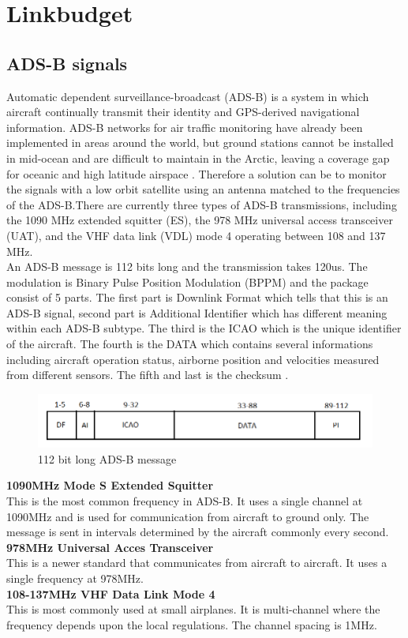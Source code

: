 \chapter{Linkbudget}\label{ch:linkbudget}

\section{ADS-B signals}
Automatic dependent surveillance-broadcast (ADS-B) is a system in which aircraft continually transmit their identity and GPS-derived navigational information. ADS-B networks for air traffic monitoring have already been implemented in areas around the world, but ground stations cannot be installed in mid-ocean and are difficult to maintain in the Arctic, leaving a coverage gap for oceanic and high latitude airspace \citep{FlyingLab}. Therefore a solution can be to monitor the signals with a low orbit satellite using an antenna matched to the frequencies of the ADS-B.There are currently three types of ADS-B transmissions, including the 1090 MHz extended squitter (ES), the 978 MHz universal access transceiver (UAT), and the VHF data link (VDL) mode 4 operating between 108 and 137 MHz.
 \\
An ADS-B message is 112 bits long and the transmission takes 120us. The modulation is Binary Pulse Position Modulation (BPPM) and the package consist of 5 parts. The first part is Downlink Format which tells that this is an ADS-B signal, second part is Additional Identifier which has different meaning within each ADS-B subtype. The third is the ICAO which is the unique identifier of the aircraft. The fourth is the DATA which contains several informations including aircraft operation status, airborne position and velocities measured from different sensors. The fifth and last is the checksum \citep{Modesorg}.      

\begin{figure}[h]
\centering 
\includegraphics[scale = 0.5]{figures/adsb_signals/adsb_message.png}
\caption{112 bit long ADS-B message}
\label{fig:adsb_mes}
\end{figure}


\textbf{1090MHz Mode S Extended Squitter}\\
This is the most common frequency in ADS-B. It uses a single channel at 1090MHz and is used for communication from aircraft to ground only. The message is sent in intervals determined by the aircraft commonly every second.   
\\
\textbf{978MHz Universal Acces Transceiver}\\
This is a newer standard that communicates from aircraft to aircraft. It uses a single frequency at 978MHz.  
\\
\textbf{108-137MHz VHF Data Link Mode 4}\\
This is most commonly used at small airplanes. It is multi-channel where the frequency depends upon the local regulations. The channel spacing is 1MHz. 

